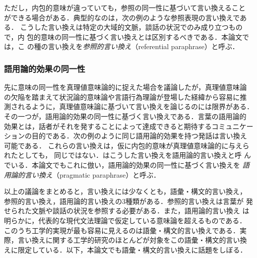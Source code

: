 ただし，内包的意味が違っていても，参照の同一性に基づいて言い換えること
ができる場合がある．典型的なのは，次の例のような参照表現の言い換えであ
る\cite{sato:99}．
こうした言い換えは特定の大域的文脈，談話の状況でのみ成り立つもので，内
包的意味の同一性に基づく言い換えとは区別するべきである．本論文では，こ
の種の言い換えを\emph{参照的言い換え}（referential paraphrase）と呼ぶ．

\subsubsection{語用論的効果の同一性}

先に意味の同一性を真理値意味論的に捉えた場合を議論したが，真理値意味論
の欠陥を踏まえて状況論的意味論や言語行為理論が登場した経緯から容易に推
測されるように，真理値意味論に基づいて言い換えを論じるのには限界がある．
その一つが，語用論的効果の同一性に基づく言い換えである．言葉の語用論的
効果とは，話者がそれを発することによって達成できると期待するコミュニケー
ションの目的である．次の例のように同じ語用論的効果を持つ発話は言い換え
可能である\cite{sato:99,kawamura:00}．
これらの言い換えは，仮に内包的意味が真理値意味論的に与えられたとしても，
同じではない．はこうした言い換えを語用論的言い換えと呼
んでいる．本論文でもこれに倣い，語用論的効果の同一性に基づく言い換えを
\emph{語用論的言い換え}（pragmatic paraphrase）と呼ぶ．

\bigskip

以上の議論をまとめると，言い換えには少なくとも，語彙・構文的言い換え，
参照的言い換え，語用論的言い換えの3種類がある．参照的言い換えは言葉が
発せられた文脈や談話の状況を参照する必要がある．また，語用論的言い換え
は明らかに，代表的な現代文法理論で仮定している意味論を超えるものである．
このうち工学的実現が最も容易に見えるのは語彙・構文的言い換えである．実
際，言い換えに関する工学的研究のほとんどが対象をこの語彙・構文的言い換
えに限定している．以下，本論文でも語彙・構文的言い換えに話題をしぼる．

